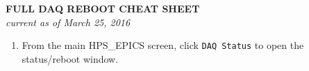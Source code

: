 \documentclass[letter,12pt]{article}
\begin{document}
\begin{center}
\textbf{FULL DAQ REBOOT CHEAT SHEET} \\

\textit{current as of March 25, 2016}
\end{center}

\begin{enumerate}

\item 
\begin{minipage}[t]{0.35\textwidth}
From the main HPS\_EPICS screen, click \texttt{DAQ Status} to open the status/reboot window.
\end{minipage}
\hspace*{0.0\textwidth}
\begin{minipage}[t]{0.55\textwidth}
\end{minipage}


\end{enumerate}
\end{document}

